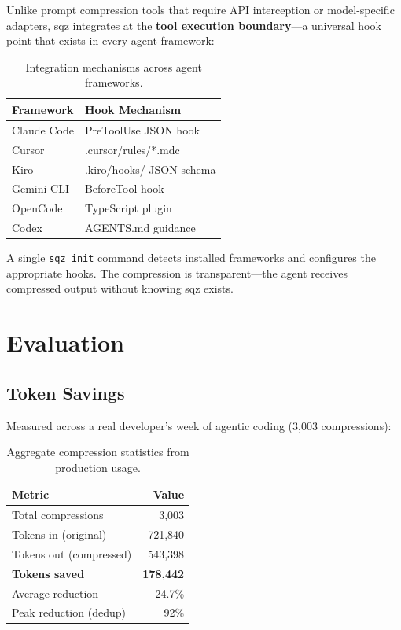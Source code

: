\documentclass[10pt,twocolumn]{article}
\begin{document}
Unlike prompt compression tools that require API interception or model-specific adapters, sqz integrates at the \textbf{tool execution boundary}---a universal hook point that exists in every agent framework:

\begin{table}[h]
\centering
\small
\begin{tabular}{@{}ll@{}}
\toprule
\textbf{Framework} & \textbf{Hook Mechanism} \\
\midrule
Claude Code & PreToolUse JSON hook \\
Cursor & .cursor/rules/*.mdc \\
Kiro & .kiro/hooks/ JSON schema \\
Gemini CLI & BeforeTool hook \\
OpenCode & TypeScript plugin \\
Codex & AGENTS.md guidance \\
\bottomrule
\end{tabular}
\caption{Integration mechanisms across agent frameworks.}
\label{tab:integration}
\end{table}

A single \texttt{sqz init} command detects installed frameworks and configures the appropriate hooks. The compression is transparent---the agent receives compressed output without knowing sqz exists.

\section{Evaluation}

\subsection{Token Savings}

Measured across a real developer's week of agentic coding (3,003 compressions):

\begin{table}[h]
\centering
\small
\begin{tabular}{@{}lr@{}}
\toprule
\textbf{Metric} & \textbf{Value} \\
\midrule
Total compressions & 3,003 \\
Tokens in (original) & 721,840 \\
Tokens out (compressed) & 543,398 \\
\textbf{Tokens saved} & \textbf{178,442} \\
Average reduction & 24.7\% \\
Peak reduction (dedup) & 92\% \\
\bottomrule
\end{tabular}
\caption{Aggregate compression statistics from production usage.}
\label{tab:stats}
\end{table}
\end{document}
